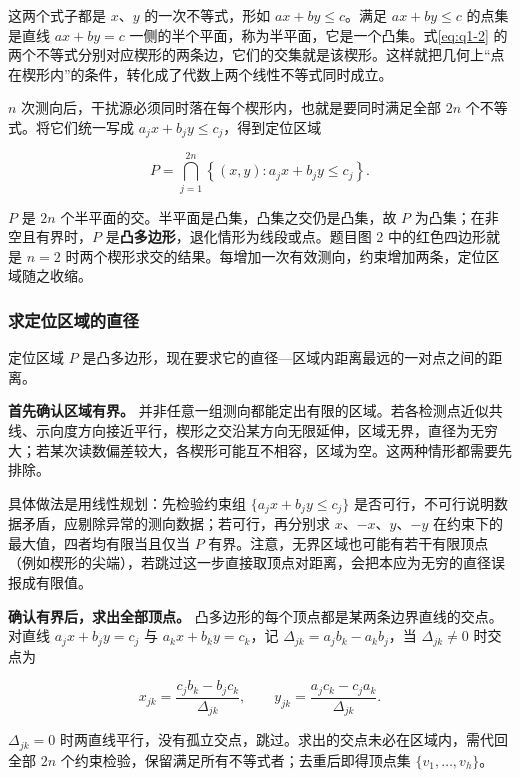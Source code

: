 这两个式子都是 $x$、$y$ 的一次不等式，形如 $ax+by\le c$。满足 $ax+by\le c$ 的点集是直线 $ax+by=c$ 一侧的半个平面，称为半平面，它是一个凸集。式\eqref{eq:q1-2} 的两个不等式分别对应楔形的两条边，它们的交集就是该楔形。这样就把几何上“点在楔形内”的条件，转化成了代数上两个线性不等式同时成立。

$n$ 次测向后，干扰源必须同时落在每个楔形内，也就是要同时满足全部 $2n$ 个不等式。将它们统一写成 $a_jx+b_jy\le c_j$，得到定位区域

\begin{equation}\label{eq:q1-3}
P=\bigcap_{j=1}^{2n}\left\{(x,y):a_jx+b_jy\le c_j\right\}.
\end{equation}

$P$ 是 $2n$ 个半平面的交。半平面是凸集，凸集之交仍是凸集，故 $P$ 为凸集；在非空且有界时，$P$ 是\textbf{凸多边形}，退化情形为线段或点。题目图 2 中的红色四边形就是 $n=2$ 时两个楔形求交的结果。每增加一次有效测向，约束增加两条，定位区域随之收缩。

\subsubsection{求定位区域的直径}\label{sec:q1-2}

定位区域 $P$ 是凸多边形，现在要求它的直径---区域内距离最远的一对点之间的距离。

\textbf{首先确认区域有界。} 并非任意一组测向都能定出有限的区域。若各检测点近似共线、示向度方向接近平行，楔形之交沿某方向无限延伸，区域无界，直径为无穷大；若某次读数偏差较大，各楔形可能互不相容，区域为空。这两种情形都需要先排除。

具体做法是用线性规划：先检验约束组 $\{a_jx+b_jy\le c_j\}$ 是否可行，不可行说明数据矛盾，应剔除异常的测向数据；若可行，再分别求 $x$、$-x$、$y$、$-y$ 在约束下的最大值，四者均有限当且仅当 $P$ 有界。注意，无界区域也可能有若干有限顶点（例如楔形的尖端），若跳过这一步直接取顶点对距离，会把本应为无穷的直径误报成有限值。

\textbf{确认有界后，求出全部顶点。} 凸多边形的每个顶点都是某两条边界直线的交点。对直线 $a_jx+b_jy=c_j$ 与 $a_kx+b_ky=c_k$，记 $\Delta_{jk}=a_jb_k-a_kb_j$，当 $\Delta_{jk}\ne0$ 时交点为

\begin{equation}\label{eq:q1-4}
x_{jk}=\frac{c_jb_k-b_jc_k}{\Delta_{jk}},\qquad
y_{jk}=\frac{a_jc_k-c_ja_k}{\Delta_{jk}}.
\end{equation}

$\Delta_{jk}=0$ 时两直线平行，没有孤立交点，跳过。求出的交点未必在区域内，需代回全部 $2n$ 个约束检验，保留满足所有不等式者；去重后即得顶点集 $\{v_1,\dots,v_h\}$。

